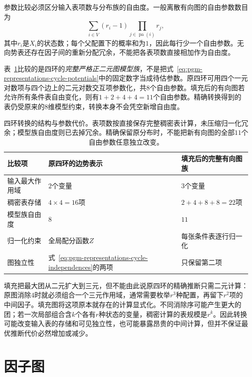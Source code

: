 参数比较必须区分输入表项数与分布族的自由度。一般离散有向图的自由参数数目为
\[
  \sum_{i\in V}(r_i-1)
  \prod_{j\in\operatorname{pa}(i)}r_j,
\]
其中$r_i$是$X_i$的状态数；每个父配置下的概率和为$1$，因此每行少一个自由参数。无向势表还存在因子间的重新分配冗余，不能把各表项数直接相加作为自由度。

表~\ref{tab:pgm-representations-cycle-costs}比较的是四环的\emph{完整严格正二元图模型族}，不是把式~\eqref{eq:pgm-representations-cycle-potentials}中的固定数字当成待估参数。原四环可用四个一元对数项与四个边上的二元对数交互项参数化，共$8$个自由参数。填充后的有向图若允许所有条件表自由变化，则有$1+2+4+4=11$个自由参数。精确转换得到的表仍受原来的$8$维模型约束，转换本身不会凭空新增自由度。

\begin{table}[htbp]
  \centering
  \begin{tabularx}{\linewidth}{@{}lXX@{}}
    \toprule
    比较项 & 原四环的边势表示 & 填充后的完整有向图族 \\
    \midrule
    输入最大作用域 & $2$个变量 & $3$个变量 \\
    稠密表存储 & $4\times4=16$项 & $2+4+8+8=22$项 \\
    模型族自由度 & $8$ & $11$ \\
    归一化约束 & 全局配分函数$Z$ & 每张条件表逐行归一化 \\
    图独立性 & 式~\eqref{eq:pgm-representations-cycle-independences}的两项 & 只保留第二项 \\
    \bottomrule
  \end{tabularx}
  \caption{四环转换的结构与参数代价。表项数按直接保存完整稠密表计算，未压缩归一化冗余；模型族自由度则已去掉冗余。精确保留原分布时，不能把新有向图的全部$11$个自由参数任意独立改变。}
  \label{tab:pgm-representations-cycle-costs}
\end{table}

填充把最大团从二元扩大到三元，但不能由此说原四环的精确推断只需二元计算：原图消除$4$时就必须组合一个三元作用域，通常需要枚举$r^3$种配置，再留下$r^2$项的中间因子。填充图将这项原本就存在的计算显式化。不同消除序可能产生更大的团；若一次局部组合含$k$个各有$r$种状态的变量，稠密计算的表规模是$r^k$。因此转换可能改变输入表的存储和可见独立性，也可能暴露昂贵的中间计算，但并不保证最优推断代价必然增加或减少。

\section{因子图}
\label{sec:pgm-representations-factor-graphs}

